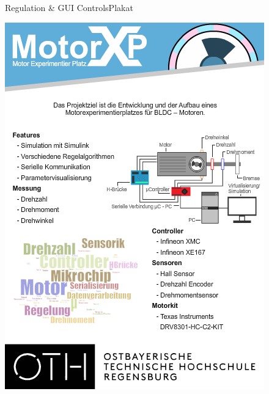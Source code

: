 	\begin{frame}{Regulation \& GUI Controls}{Plakat}
		\begin{center}			
			\includegraphics[height=0.6\textwidth]{../regulation/Plakat.png}
		\end{center}
	\end{frame}